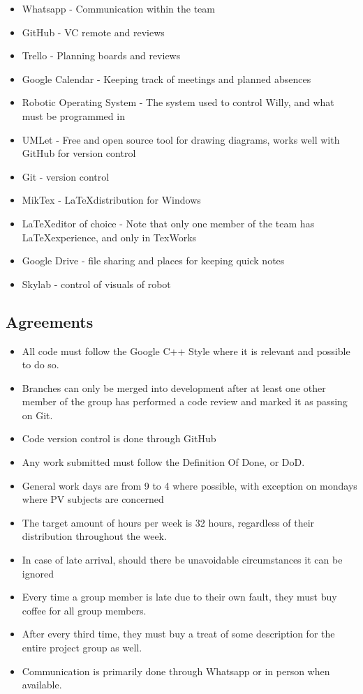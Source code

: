 \begin{itemize}
\item Whatsapp - Communication within the team
\item GitHub - VC remote and reviews
\item Trello - Planning boards and reviews
\item Google Calendar  - Keeping track of meetings and planned absences
\item Robotic Operating System - The system used to control Willy, and what must be programmed in
\item UMLet - Free and open source tool for drawing diagrams, works well with GitHub for version control
\item Git - version control
\item MikTex - \LaTeX distribution for Windows
\item \LaTeX editor of choice - Note that only one member of the team has \LaTeX experience, and only in TexWorks
\item Google Drive - file sharing and places for keeping quick notes
\item Skylab - control of visuals of robot
\end{itemize}

\subsection{Agreements}
\begin{itemize}
	\item All code must follow the Google C++ Style where it is relevant and possible to do so.
	\item Branches can only be merged into development after at least one other member of the group has performed a code review and marked it as passing on Git.
	\item Code version control is done through GitHub
	\item Any work submitted must follow the Definition Of Done, or DoD.
\item General work days are from 9 to 4 where possible, with exception on mondays where PV subjects are concerned
\item The target amount of hours per week is 32 hours, regardless of their distribution throughout the week.
\item In case of late arrival, should there be unavoidable circumstances it can be ignored
\item Every time a group member is late due to their own fault, they must buy coffee for all group members.
\item After every third time, they must buy a treat of some description for the entire project group as well.
\item Communication is primarily done through Whatsapp or in person when available.
\end{itemize}
\newpage
